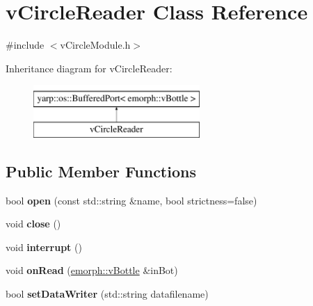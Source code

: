 \hypertarget{classvCircleReader}{\section{v\-Circle\-Reader Class Reference}
\label{classvCircleReader}
}


{\ttfamily \#include $<$v\-Circle\-Module.\-h$>$}

Inheritance diagram for v\-Circle\-Reader\-:\begin{figure}[H]
\begin{center}
\leavevmode
\includegraphics[height=2.000000cm]{classvCircleReader}
\end{center}
\end{figure}
\subsection*{Public Member Functions}
\begin{DoxyCompactItemize}
\item 
\hypertarget{classvCircleReader_aeea09b1b0a4f6ca43362430e2b7c13f3}{bool {\bfseries open} (const std\-::string \&name, bool strictness=false)}\label{classvCircleReader_aeea09b1b0a4f6ca43362430e2b7c13f3}

\item 
\hypertarget{classvCircleReader_a963ecb3d9e66c9a6d0dd3deb0107d333}{void {\bfseries close} ()}\label{classvCircleReader_a963ecb3d9e66c9a6d0dd3deb0107d333}

\item 
\hypertarget{classvCircleReader_adb1e49808d1ff24b38e68ad3c706d87a}{void {\bfseries interrupt} ()}\label{classvCircleReader_adb1e49808d1ff24b38e68ad3c706d87a}

\item 
\hypertarget{classvCircleReader_a413308d9f280c2e5040e0b10fc9ccd5b}{void {\bfseries on\-Read} (\hyperlink{classemorph_1_1vBottle}{emorph\-::v\-Bottle} \&in\-Bot)}\label{classvCircleReader_a413308d9f280c2e5040e0b10fc9ccd5b}

\item 
\hypertarget{classvCircleReader_a13856006b160d12edb43f0130f5a0987}{bool {\bfseries set\-Data\-Writer} (std\-::string datafilename)}\label{classvCircleReader_a13856006b160d12edb43f0130f5a0987}

\end{DoxyCompactItemize}
